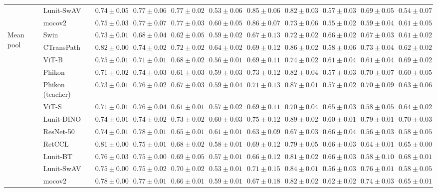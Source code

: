 \begin{tabular}{ll|cccc|c|cccc}
 & Lunit-SwAV & $0.74 \pm 0.05$ & $0.77 \pm 0.06$ & $0.77 \pm 0.02$ & $0.53 \pm 0.06$ & $0.85 \pm 0.06$ & $0.82 \pm 0.03$ & $0.57 \pm 0.03$ & $0.69 \pm 0.05$ & $0.54 \pm 0.07$ \\
 & mocov2 & $0.75 \pm 0.03$ & $0.77 \pm 0.07$ & $0.77 \pm 0.03$ & $0.60 \pm 0.05$ & $0.86 \pm 0.07$ & $0.73 \pm 0.06$ & $0.55 \pm 0.02$ & $0.59 \pm 0.04$ & $0.61 \pm 0.05$ \\
\cline{1-11}
\multirow[t]{12}{*}{Mean pool} & Swin & $0.73 \pm 0.01$ & $0.68 \pm 0.04$ & $0.62 \pm 0.05$ & $0.59 \pm 0.02$ & $0.67 \pm 0.13$ & $0.72 \pm 0.02$ & $\mathbf{0.66 \pm 0.02}$ & $0.67 \pm 0.03$ & $0.61 \pm 0.02$ \\
 & CTransPath & $\mathbf{0.82 \pm 0.00}$ & $0.74 \pm 0.02$ & $0.72 \pm 0.02$ & $\mathbf{0.64 \pm 0.02}$ & $0.69 \pm 0.12$ & $0.86 \pm 0.02$ & $0.58 \pm 0.06$ & $0.73 \pm 0.04$ & $0.62 \pm 0.02$ \\
 & ViT-B & $0.75 \pm 0.01$ & $0.71 \pm 0.01$ & $0.68 \pm 0.02$ & $0.56 \pm 0.01$ & $0.69 \pm 0.11$ & $0.74 \pm 0.02$ & $0.61 \pm 0.04$ & $0.61 \pm 0.04$ & $0.69 \pm 0.02$ \\
 & Phikon & $0.71 \pm 0.02$ & $0.74 \pm 0.03$ & $0.61 \pm 0.03$ & $0.59 \pm 0.03$ & $0.73 \pm 0.12$ & $0.82 \pm 0.04$ & $0.57 \pm 0.03$ & $0.70 \pm 0.07$ & $0.60 \pm 0.05$ \\
 & Phikon (teacher) & $0.73 \pm 0.01$ & $0.76 \pm 0.02$ & $0.67 \pm 0.03$ & $0.59 \pm 0.04$ & $0.71 \pm 0.13$ & $0.87 \pm 0.01$ & $0.57 \pm 0.02$ & $0.70 \pm 0.09$ & $0.63 \pm 0.06$ \\
 & ViT-S & $0.71 \pm 0.01$ & $0.76 \pm 0.04$ & $0.61 \pm 0.01$ & $0.57 \pm 0.02$ & $0.69 \pm 0.11$ & $0.70 \pm 0.04$ & $0.65 \pm 0.03$ & $0.58 \pm 0.05$ & $0.64 \pm 0.02$ \\
 & Lunit-DINO & $0.74 \pm 0.01$ & $0.74 \pm 0.02$ & $\mathbf{0.73 \pm 0.02}$ & $0.60 \pm 0.03$ & $\mathbf{0.75 \pm 0.12}$ & $\mathbf{0.89 \pm 0.02}$ & $0.60 \pm 0.01$ & $\mathbf{0.79 \pm 0.01}$ & $\mathbf{0.70 \pm 0.03}$ \\
 & ResNet-50 & $0.74 \pm 0.01$ & $\mathbf{0.78 \pm 0.01}$ & $0.65 \pm 0.01$ & $0.61 \pm 0.01$ & $0.63 \pm 0.09$ & $0.67 \pm 0.03$ & $0.66 \pm 0.04$ & $0.56 \pm 0.03$ & $0.58 \pm 0.05$ \\
 & RetCCL & $0.81 \pm 0.00$ & $0.75 \pm 0.01$ & $0.68 \pm 0.02$ & $0.58 \pm 0.01$ & $0.69 \pm 0.12$ & $0.79 \pm 0.05$ & $0.66 \pm 0.03$ & $0.64 \pm 0.01$ & $0.65 \pm 0.00$ \\
 & Lunit-BT & $0.76 \pm 0.03$ & $0.75 \pm 0.00$ & $0.69 \pm 0.05$ & $0.57 \pm 0.01$ & $0.66 \pm 0.12$ & $0.81 \pm 0.02$ & $0.66 \pm 0.03$ & $0.58 \pm 0.10$ & $0.68 \pm 0.01$ \\
 & Lunit-SwAV & $0.75 \pm 0.00$ & $0.75 \pm 0.02$ & $0.70 \pm 0.02$ & $0.53 \pm 0.01$ & $0.71 \pm 0.15$ & $0.84 \pm 0.01$ & $0.56 \pm 0.03$ & $0.76 \pm 0.01$ & $0.58 \pm 0.05$ \\
 & mocov2 & $0.78 \pm 0.00$ & $0.77 \pm 0.01$ & $0.66 \pm 0.01$ & $0.59 \pm 0.01$ & $0.67 \pm 0.18$ & $0.82 \pm 0.02$ & $0.62 \pm 0.02$ & $0.74 \pm 0.03$ & $0.65 \pm 0.01$ \\
\cline{1-11}
\bottomrule
\end{tabular}
